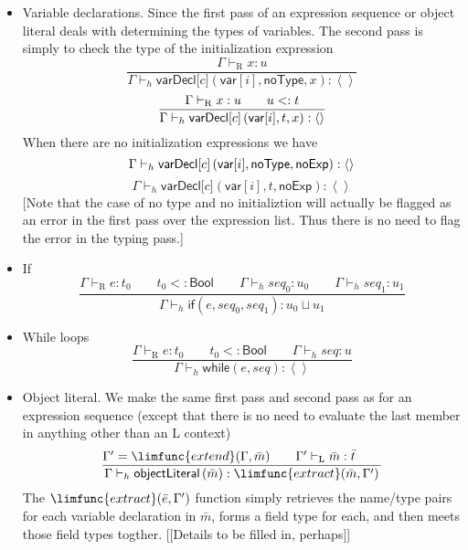 \documentclass[12pt]{article}
\begin{document}
\begin{itemize}
\item Variable declarations. Since the first pass of an expression sequence
or object literal deals with determining the types of variables. The second
pass is simply to check the type of the initialization expression%
\begin{equation*}
\frac{\Gamma \vdash _{\mathrm{R}}x:u}{\Gamma \vdash _{h}\mathsf{varDecl[}c%
\mathsf{]}\left( \mathsf{var}[i],\mathsf{noType},x\right) :\left\langle
{}\right\rangle }
\end{equation*}%
\begin{equation*}
\frac{\Gamma \vdash _{\mathrm{R}}x:u\qquad u<:t}{\Gamma \vdash _{h}\mathsf{%
varDecl[}c\mathsf{]}\left( \mathsf{var}[i],t,x\right) :\left\langle
{}\right\rangle }
\end{equation*}%
When there are no initialization expressions we have%
\begin{equation*}
\Gamma \vdash _{h}\mathsf{varDecl[}c\mathsf{]}\left( \mathsf{var}[i],\mathsf{%
noType},\mathsf{noExp}\right) :\left\langle {}\right\rangle
\end{equation*}%
\begin{equation*}
\Gamma \vdash _{h}\mathsf{varDecl[}c\mathsf{]}\left( \mathsf{var}[i],t,%
\mathsf{noExp}\right) :\left\langle {}\right\rangle
\end{equation*}%
[Note that the case of no type and no initializtion will actually be flagged
as an error in the first pass over the expression list. Thus there is no
need to flag the error in the typing pass.]

\item If%
\begin{equation*}
\frac{\Gamma \vdash _{\mathrm{R}}e:t_{0}\qquad t_{0}<:\mathsf{Bool}\qquad
\Gamma \vdash _{h}\mathit{seq}_{0}:u_{0}\qquad \Gamma \vdash _{h}\mathit{seq}%
_{1}:u_{1}}{\Gamma \vdash _{h}\mathsf{if}(e,\mathit{seq}_{0},\mathit{seq}%
_{1}):u_{0}\sqcup u_{1}}
\end{equation*}

\item While loops%
\begin{equation*}
\frac{\Gamma \vdash _{\mathrm{R}}e:t_{0}\qquad t_{0}<:\mathsf{Bool}\qquad
\Gamma \vdash _{h}\mathit{seq}:u}{\Gamma \vdash _{h}\mathsf{while}\left( e,%
\mathit{seq}\right) :\left\langle {}\right\rangle }
\end{equation*}

\item Object literal. We make the same first pass and second pass as for an
expression sequence (except that there is no need to evaluate the last
member in anything other than an L context)%
\begin{equation*}
\frac{\Gamma ^{\prime }=\limfunc{extend}(\Gamma ,\bar{m})\qquad \Gamma
^{\prime }\vdash _{\mathrm{L}}\bar{m}:\bar{t}\qquad }{\Gamma \vdash _{h}%
\mathsf{objectLiteral}\left( \bar{m}\right) :\limfunc{extract}(\bar{m}%
,\Gamma ^{\prime })}
\end{equation*}%
The $\limfunc{extract}(\bar{e},\Gamma ^{\prime })$ function simply retrieves
the name/type pairs for each variable declaration in $\bar{m}$, forms a
field type for each, and then meets those field types togther. [[Details to
be filled in, perhaps]]


\end{itemize}
\end{document}
